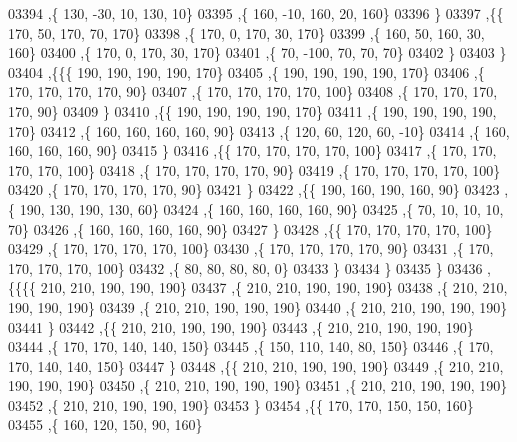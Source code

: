 \begin{DoxyCode}
03394     ,\{   130,   -30,    10,   130,    10\}
03395     ,\{   160,   -10,   160,    20,   160\}
03396     \}
03397    ,\{\{   170,    50,   170,    70,   170\}
03398     ,\{   170,     0,   170,    30,   170\}
03399     ,\{   160,    50,   160,    30,   160\}
03400     ,\{   170,     0,   170,    30,   170\}
03401     ,\{    70,  -100,    70,    70,    70\}
03402     \}
03403    \}
03404   ,\{\{\{   190,   190,   190,   190,   170\}
03405     ,\{   190,   190,   190,   190,   170\}
03406     ,\{   170,   170,   170,   170,    90\}
03407     ,\{   170,   170,   170,   170,   100\}
03408     ,\{   170,   170,   170,   170,    90\}
03409     \}
03410    ,\{\{   190,   190,   190,   190,   170\}
03411     ,\{   190,   190,   190,   190,   170\}
03412     ,\{   160,   160,   160,   160,    90\}
03413     ,\{   120,    60,   120,    60,   -10\}
03414     ,\{   160,   160,   160,   160,    90\}
03415     \}
03416    ,\{\{   170,   170,   170,   170,   100\}
03417     ,\{   170,   170,   170,   170,   100\}
03418     ,\{   170,   170,   170,   170,    90\}
03419     ,\{   170,   170,   170,   170,   100\}
03420     ,\{   170,   170,   170,   170,    90\}
03421     \}
03422    ,\{\{   190,   160,   190,   160,    90\}
03423     ,\{   190,   130,   190,   130,    60\}
03424     ,\{   160,   160,   160,   160,    90\}
03425     ,\{    70,    10,    10,    10,    70\}
03426     ,\{   160,   160,   160,   160,    90\}
03427     \}
03428    ,\{\{   170,   170,   170,   170,   100\}
03429     ,\{   170,   170,   170,   170,   100\}
03430     ,\{   170,   170,   170,   170,    90\}
03431     ,\{   170,   170,   170,   170,   100\}
03432     ,\{    80,    80,    80,    80,     0\}
03433     \}
03434    \}
03435   \}
03436  ,\{\{\{\{   210,   210,   190,   190,   190\}
03437     ,\{   210,   210,   190,   190,   190\}
03438     ,\{   210,   210,   190,   190,   190\}
03439     ,\{   210,   210,   190,   190,   190\}
03440     ,\{   210,   210,   190,   190,   190\}
03441     \}
03442    ,\{\{   210,   210,   190,   190,   190\}
03443     ,\{   210,   210,   190,   190,   190\}
03444     ,\{   170,   170,   140,   140,   150\}
03445     ,\{   150,   110,   140,    80,   150\}
03446     ,\{   170,   170,   140,   140,   150\}
03447     \}
03448    ,\{\{   210,   210,   190,   190,   190\}
03449     ,\{   210,   210,   190,   190,   190\}
03450     ,\{   210,   210,   190,   190,   190\}
03451     ,\{   210,   210,   190,   190,   190\}
03452     ,\{   210,   210,   190,   190,   190\}
03453     \}
03454    ,\{\{   170,   170,   150,   150,   160\}
03455     ,\{   160,   120,   150,    90,   160\}

\end{DoxyCode}
